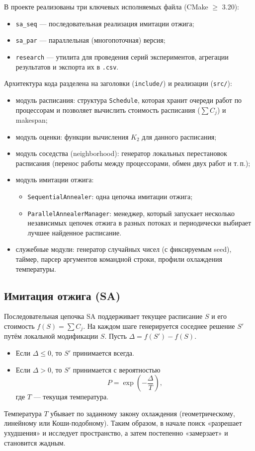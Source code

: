 \documentclass[a4paper,12pt]{article}
\begin{document}
В проекте реализованы три ключевых исполняемых файла (CMake $\geq$ 3.20):
\begin{itemize}
    \item \texttt{sa\_seq} --- последовательная реализация имитации отжига;
    \item \texttt{sa\_par} --- параллельная (многопоточная) версия;
    \item \texttt{research} --- утилита для проведения серий экспериментов, агрегации результатов и экспорта их в \texttt{.csv}.
\end{itemize}

Архитектура кода разделена на заголовки (\texttt{include/}) и реализации (\texttt{src/}):

\begin{itemize}
    \item модуль расписания: структура \texttt{Schedule}, которая хранит очереди работ по процессорам и позволяет вычислить стоимость расписания ($\sum C_j$) и makespan;
    \item модуль оценки: функции вычисления $K_2$ для данного расписания;
    \item модуль соседства (neighborhood): генератор локальных перестановок расписания (перенос работы между процессорами, обмен двух работ и т.\,п.);
    \item модуль имитации отжига:
    \begin{itemize}
        \item \texttt{SequentialAnnealer}: одна цепочка имитации отжига;
        \item \texttt{ParallelAnnealerManager}: менеджер, который запускает несколько независимых цепочек отжига в разных потоках и периодически выбирает лучшее найденное расписание.
    \end{itemize}
    \item служебные модули: генератор случайных чисел (с фиксируемым seed), таймер, парсер аргументов командной строки, профили охлаждения температуры.
\end{itemize}

\subsection*{Имитация отжига (SA)}

Последовательная цепочка SA поддерживает текущее расписание $S$ и его стоимость $f(S)=\sum C_j$. На каждом шаге генерируется соседнее решение $S'$ путём локальной модификации $S$. Пусть $\Delta = f(S')-f(S)$.
\begin{itemize}
    \item Если $\Delta \le 0$, то $S'$ принимается всегда.
    \item Если $\Delta > 0$, то $S'$ принимается с вероятностью
    \[
        P = \exp\!\left(-\frac{\Delta}{T}\right),
    \]
    где $T$ --- текущая температура.
\end{itemize}
Температура $T$ убывает по заданному закону охлаждения (геометрическому, линейному или Коши-подобному). Таким образом, в начале поиск «разрешает ухудшения» и исследует пространство, а затем постепенно «замерзает» и становится жадным.
\end{document}
